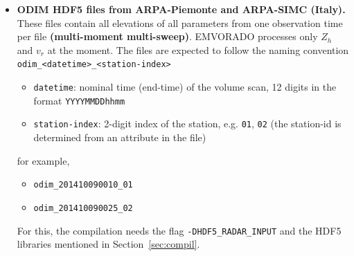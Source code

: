 \documentclass[10pt,a4paper,twoside,headinclude,footinclude,parskip=half]{scrartcl}
\newcommand{\srcform}[1]{\mbox{\texttt{#1}}\xspace}%
\begin{document}
\begin{itemize}
\item \textbf{ODIM HDF5 files from ARPA-Piemonte and ARPA-SIMC (Italy).} These files contain all elevations of all parameters from one observation time
  per file \textbf{(multi-moment multi-sweep)}. EMVORADO processes only $Z_h$ and $v_r$ at the moment. The files are expected to follow the naming convention\\[0.5em]
  \verb|odim_<datetime>_<station-index>|
  \begin{itemize}
  \item \verb|datetime|: nominal time (end-time) of the volume scan, 12 digits in the format \verb|YYYYMMDDhhmm|
  \item \verb|station-index|: 2-digit index of the station, e.g. \verb|01|, \verb|02| (the station-id is determined from an attribute in the file)
  \end{itemize}
  for example,
  \begin{itemize}
  \item \verb|odim_201410090010_01|
  \item \verb|odim_201410090025_02|
  \end{itemize}
  For this, the compilation needs the flag \srcform{-DHDF5_RADAR_INPUT} and the HDF5 libraries mentioned in Section~\ref{sec:compil}.


\end{itemize}
\end{document}
